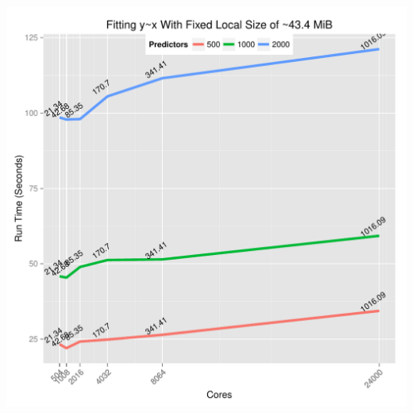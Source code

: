 \begin{frame}
  \begin{block}{}
  \begin{center}
    \includegraphics[height=.88\textheight]{pics/lmfit2}
  \end{center}
  \end{block}
\end{frame}